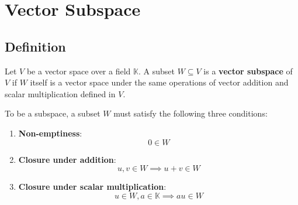 \section{Vector Subspace}
\label{sec:vector-subspace}

\subsection{Definition}
\label{subsec:definition}

Let \( V \) be a vector space over a field \( \mathbb{K} \).
A subset \( W \subseteq V \) is a \textbf{vector subspace} of \( V \) if \( W \) itself is a vector
space under the same operations of vector addition and scalar multiplication defined in \( V \).

To be a subspace, a subset \( W \) must satisfy the following three conditions:
\begin{enumerate}
    \item \textbf{Non-emptiness}:
    \begin{equation}
        0 \in W
    \end{equation}
    \item \textbf{Closure under addition}:
    \begin{equation}
        u, v \in W \implies u + v \in W
    \end{equation}
    \item \textbf{Closure under scalar multiplication}:
    \begin{equation}
        u \in W, a \in \mathbb{K} \implies au \in W
    \end{equation}
\end{enumerate}